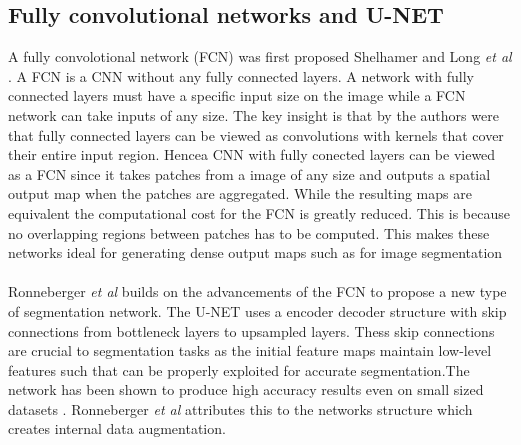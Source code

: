 \documentclass[a4paper,11pt]{article}
\begin{document}
\subsection{Fully convolutional networks and U-NET}
A fully convolotional network (FCN) was first proposed Shelhamer and Long \textit{et al} \citep{shelhamer_fully_2016}. A FCN is a CNN without any fully connected layers. A network with fully connected layers must have a specific input size on the image while a FCN network can take inputs of any size. The key insight is that by the authors were that fully connected layers can be viewed as convolutions with kernels that cover their entire input region. Hencea CNN with fully conected layers can be viewed as a FCN since it takes patches from a image of any size and outputs a spatial output map when the patches are aggregated. While the resulting maps are equivalent the computational cost for the FCN is greatly reduced. This is because no overlapping regions between patches has to be computed. This makes these networks ideal for generating dense output maps such as for image segmentation\\
\\
Ronneberger \textit{et al} \cite{ronneberger_u-net:_2015} builds on the advancements of the FCN to propose a new type of segmentation network. The U-NET uses a encoder decoder structure with skip connections from bottleneck layers to upsampled layers. Thess skip connections are crucial to segmentation tasks as the initial feature
maps maintain low-level features such that can be properly exploited for accurate segmentation.The network has been shown to produce high accuracy results even on small sized datasets \cite{son_retinal_2017, ronneberger_u-net:_2015, isola_image--image_2016, xue_segan:_2017, yang_automatic_2017}. Ronneberger \textit{et al} \cite{ronneberger_u-net:_2015} attributes this to the networks structure which creates internal data augmentation.
\end{document}
